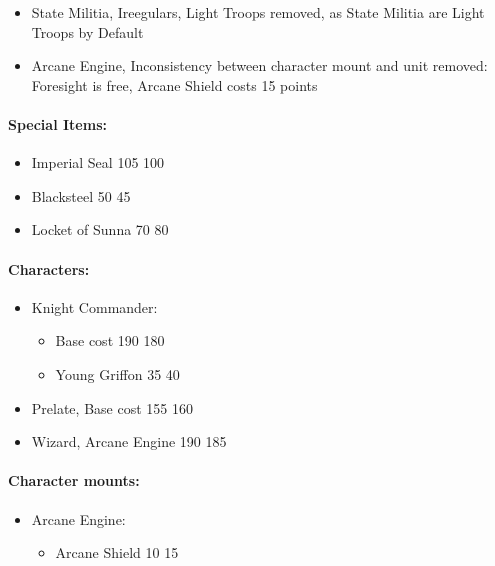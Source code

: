


\begin{itemize}
\item State Militia, Ireegulars, Light Troops removed, as State Militia are Light Troops by Default
\item Arcane Engine, Inconsistency between character mount and unit removed: Foresight is free, Arcane Shield costs 15 points
\end{itemize}

\subtitle{beta 2.2}


\begin{multicols}{2}
\paragraph{Special Items:}
\begin{itemize}
	\item Imperial Seal 105 \costdown{} 100
	\item Blacksteel 50 \costdown{} 45
	\item Locket of Sunna 70 \costup{} 80
\end{itemize}
\paragraph{Characters:}
\begin{itemize}
	\item Knight Commander:
	\begin{itemize} 
		\item Base cost 190 \costdown{} 180
		\item Young Griffon 35 \costup{} 40
	\end{itemize}
	\item Prelate, Base cost 155 \costup{} 160
	\item Wizard, Arcane Engine 190 \costdown{} 185
\end{itemize}
\paragraph{Character mounts:}
\begin{itemize}
	\item Arcane Engine:
	\begin{itemize}
		\item Arcane Shield 10 \costup{} 15
	\end{itemize}
\end{itemize}

\end{multicols}
